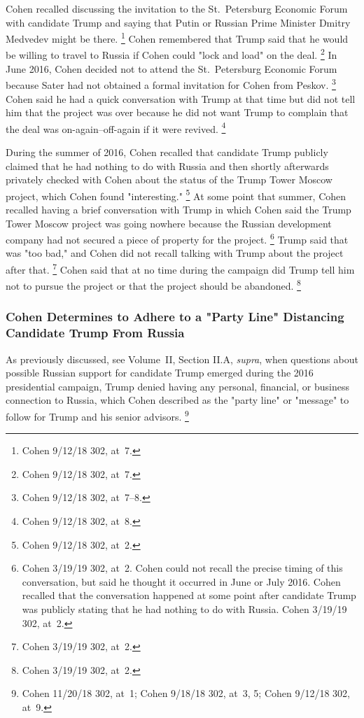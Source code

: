 {Cohen recalled discussing the invitation to the St.~Petersburg Economic Forum with candidate Trump and saying that Putin or Russian Prime Minister Dmitry Medvedev might be there.%
\footnote{Cohen 9/12/18 302, at~7.}
Cohen remembered that Trump said that he would be willing to travel to Russia if Cohen could "lock and load" on the deal.%
\footnote{Cohen 9/12/18 302, at~7.}
In June 2016, Cohen decided not to attend the St.~Petersburg Economic Forum because Sater had not obtained a formal invitation for Cohen from Peskov.%
\footnote{Cohen 9/12/18 302, at~7--8.}
Cohen said he had a quick conversation with Trump at that time but did not tell him that the project was over because he did not want Trump to complain that the deal was on-again--off-again if it were revived.%
\footnote{Cohen 9/12/18 302, at~8.}

During the summer of 2016, Cohen recalled that candidate Trump publicly claimed that he had nothing to do with Russia and then shortly afterwards privately checked with Cohen about the status of the Trump Tower Moscow project, which Cohen found "interesting."%
\footnote{Cohen 9/12/18 302, at~2.}
At some point that summer, Cohen recalled having a brief conversation with Trump in which Cohen said the Trump Tower Moscow project was going nowhere because the Russian development company had not secured a piece of property for the project.%
\footnote{Cohen 3/19/19 302, at~2.
Cohen could not recall the precise timing of this conversation, but said he thought it occurred in June or July 2016.
Cohen recalled that the conversation happened at some point after candidate Trump was publicly stating that he had nothing to do with Russia.
Cohen 3/19/19 302, at~2.}
Trump said that was "too bad," and Cohen did not recall talking with Trump about the project after that.%
\footnote{Cohen 3/19/19 302, at~2.}
Cohen said that at no time during the campaign did Trump tell him not to pursue the project or that the project should be abandoned.%
\footnote{Cohen 3/19/19 302, at~2.}

\subsubsection{Cohen Determines to Adhere to a "Party Line" Distancing Candidate Trump From Russia}

As previously discussed, see Volume~II, Section II.A, \textit{supra}, when questions about possible Russian support for candidate Trump emerged during the 2016 presidential campaign, Trump denied having any personal, financial, or business connection to Russia, which Cohen described as the "party line" or "message" to follow for Trump and his senior advisors.%
\footnote{Cohen 11/20/18 302, at~1;
Cohen 9/18/18 302, at~3, 5;
Cohen 9/12/18 302, at~9.}

}
